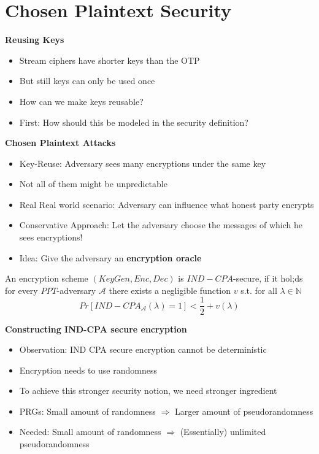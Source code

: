 

\chapter{Chosen Plaintext Security}

\textbf{Reusing Keys}
\begin{itemize}
    \item Stream ciphers have shorter keys than the OTP
    \item But still keys can only be used once
    \item How can we make keys reusable?
    \item First: How should this be modeled in the security definition?\newline
\end{itemize}


\textbf{Chosen Plaintext Attacks}
\begin{itemize}
    \item Key-Reuse: Adversary sees many encryptions under the same key
    \item Not all of them might be unpredictable
    \item Real Real world scenario: Adversary can influence what honest party encrypts
    \item Conservative Approach: Let the adversary choose the messages of which he sees encryptions!
    \item Idea: Give the adversary an \textbf{encryption oracle}\newline
\end{itemize}


\begin{definition}
    An encryption scheme $(KeyGen,Enc,Dec)$ is $IND-CPA$-secure, if it hol;ds for every $PPT$-adversary $\mathcal{A}$ there exists a negligible function $v$ s.t. for all $\lambda \in \mathbb{N}$
    $$Pr[IND-CPA_{\mathcal{A}}(\lambda)=1] < \frac{1}{2} + v(\lambda)$$\newline
\end{definition}


\textbf{Constructing IND-CPA secure encryption}
\begin{itemize}
    \item Observation: IND CPA secure encryption cannot be deterministic
    \item Encryption needs to use randomness
    \item To achieve this stronger security notion, we need stronger ingredient
    \item PRGs: Small amount of randomness $\Rightarrow$ Larger amount of pseudorandomness
    \item Needed: Small amount of randomness $\Rightarrow$ (Essentially) unlimited pseudorandomness\newline
\end{itemize}


